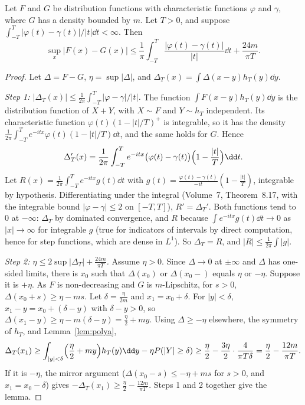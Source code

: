 \begin{lemma}\label{lem:smoothing}
Let $F$ and $G$ be distribution functions with characteristic functions $\varphi$ and $\gamma$, where $G$ has a density bounded by $m$. Let $T>0$, and
suppose $\int_{-T}^T|\varphi(t)-\gamma(t)|/|t|\dd t<\infty$. Then
\[
\sup_x|F(x)-G(x)|\le\frac1\pi\int_{-T}^T\frac{|\varphi(t)-\gamma(t)|}{|t|}\dd t+\frac{24m}{\pi T}.
\]
\end{lemma}
\begin{proof}
Let $\Delta=F-G$, $\eta=\sup|\Delta|$, and $\Delta_T(x)=\int\Delta(x-y)h_T(y)\dd y$.

\emph{Step 1: $|\Delta_T(x)|\le\frac1{2\pi}\int_{-T}^T|\varphi-\gamma|/|t|$.} The function $\int F(x-y)h_T(y)\dd y$ is the distribution function of
$X+Y$, with $X\sim F$ and $Y\sim h_T$ independent. Its characteristic function $\varphi(t)(1-|t|/T)^+$ is integrable, so it has the density
$\frac1{2\pi}\int_{-T}^Te^{-itx}\varphi(t)(1-|t|/T)\dd t$, and the same holds for $G$. Hence
\[
\Delta_T'(x)=\frac1{2\pi}\int_{-T}^Te^{-itx}\bigl(\varphi(t)-\gamma(t)\bigr)\Bigl(1-\frac{|t|}T\Bigr)\dd t.
\]
Let $R(x)=\frac1{2\pi}\int_{-T}^Te^{-itx}g(t)\dd t$ with $g(t)=\frac{\varphi(t)-\gamma(t)}{-it}(1-\frac{|t|}T)$, integrable by hypothesis. Differentiating
under the integral (Volume~7, Theorem~8.17, with the integrable bound $|\varphi-\gamma|\le2$ on $[-T,T]$), $R'=\Delta_T'$. Both functions tend to $0$ at $-\infty$: $\Delta_T$ by
dominated convergence, and $R$ because $\int e^{-itx}g(t)\dd t\to0$ as $|x|\to\infty$ for integrable $g$ (true for indicators of intervals by direct
computation, hence for step functions, which are dense in $L^1$). So $\Delta_T=R$, and $|R|\le\frac1{2\pi}\int|g|$.

\emph{Step 2: $\eta\le2\sup|\Delta_T|+\frac{24m}{\pi T}$.} Assume $\eta>0$. Since $\Delta\to0$ at $\pm\infty$ and $\Delta$ has one-sided limits, there is $x_0$
such that $\Delta(x_0)$ or $\Delta(x_0-)$ equals $\eta$ or $-\eta$. Suppose it is $+\eta$. As $F$ is non-decreasing and $G$ is $m$-Lipschitz, for $s>0$,
$\Delta(x_0+s)\ge\eta-ms$. Let $\delta=\frac\eta{2m}$ and $x_1=x_0+\delta$. For $|y|<\delta$, $x_1-y=x_0+(\delta-y)$ with $\delta-y>0$, so
$\Delta(x_1-y)\ge\eta-m(\delta-y)=\frac\eta2+my$. Using $\Delta\ge-\eta$ elsewhere, the symmetry of $h_T$, and Lemma~\ref{lem:polya},
\[
\Delta_T(x_1)\ge\int_{|y|<\delta}\Bigl(\frac\eta2+my\Bigr)h_T(y)\dd y-\eta P(|Y|\ge\delta)\ge\frac\eta2-\frac{3\eta}2\cdot\frac4{\pi T\delta}=\frac\eta2-\frac{12m}{\pi T}.
\]
If it is $-\eta$, the mirror argument ($\Delta(x_0-s)\le-\eta+ms$ for $s>0$, and $x_1=x_0-\delta$) gives $-\Delta_T(x_1)\ge\frac\eta2-\frac{12m}{\pi T}$.
Steps 1 and 2 together give the lemma.
\end{proof}

